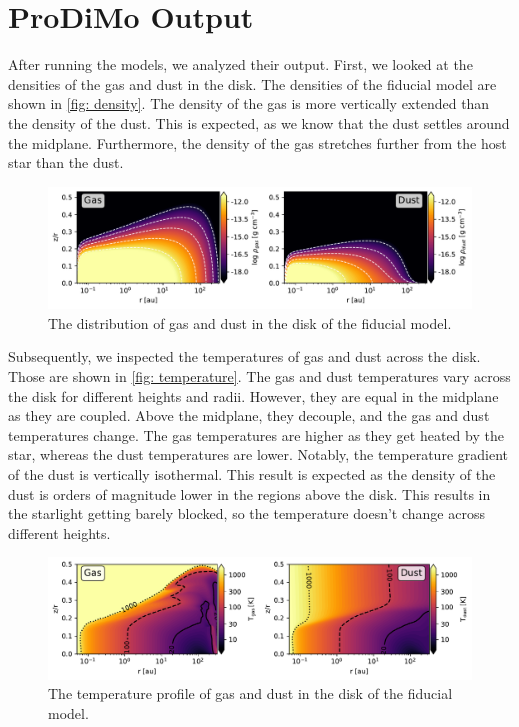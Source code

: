 \documentclass[oneside, single, authoryear, semicolon]{lion-msc}
\newcommand{\4}{$_4$}
\newcommand{\3}{$_3$}
\newcommand{\2}{$_2$}
\begin{document}
\section{ProDiMo Output}
After running the models, we analyzed their output. First, we looked at the densities of the gas and dust in the disk. The densities of the fiducial model are shown in \autoref{fig: density}. The density of the gas is more vertically extended than the density of the dust. This is expected, as we know that the dust settles around the midplane. Furthermore, the density of the gas stretches further from the host star than the dust.

\begin{figure}[!ht]
    \centering
    \includegraphics[width=\linewidth]{Figures/Density.pdf}
    \caption{The distribution of gas and dust in the disk of the fiducial model.}
    \label{fig: density}
\end{figure}

Subsequently, we inspected the temperatures of gas and dust across the disk. Those are shown in \autoref{fig: temperature}.  The gas and dust temperatures vary across the disk for different heights and radii. However, they are equal in the midplane as they are coupled. Above the midplane, they decouple, and the gas and dust temperatures change. The gas temperatures are higher as they get heated by the star, whereas the dust temperatures are lower. Notably, the temperature gradient of the dust is vertically isothermal. This result is expected as the density of the dust is orders of magnitude lower in the regions above the disk. This results in the starlight getting barely blocked, so the temperature doesn't change across different heights.

\begin{figure}[!ht]
    \centering
    \includegraphics[width=\linewidth]{Figures/Temperature.pdf}
    \caption{The temperature profile of gas and dust in the disk of the fiducial model.}
    \label{fig: temperature}
\end{figure}
\end{document}
